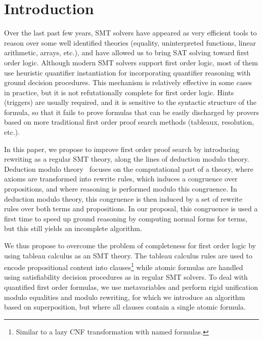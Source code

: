 
\section{Introduction}

Over the last past few
years, SMT solvers have appeared as very efficient tools to reason over some
well identified theories (equality, uninterpreted functions, linear arithmetic,
arrays, etc.), and have allowed us to bring SAT solving toward first order logic.
Although modern SMT solvers support first order logic, most of them use
heuristic quantifier instantiation for incorporating quantifier reasoning with
ground decision procedures. This mechanism is relatively effective in some cases
in practice, but it is not refutationally complete for first order logic. Hints
(triggers) are usually required, and it is sensitive to the syntactic structure
of the formula, so that it fails to prove formulas that can be easily discharged
by provers based on more traditional first order proof search methods (tableaux,
resolution, etc.).

In this paper, we propose to improve first order proof search by introducing
rewriting as a regular SMT theory, along the lines of
deduction modulo theory. Deduction modulo theory~\cite{DA03} focuses on the
computational part of a theory, where axioms are transformed into rewrite rules,
which induces a congruence over propositions, and where reasoning is performed
modulo this congruence. In deduction modulo theory, this congruence is then
induced by a set of rewrite rules over both terms and propositions. In our
proposal, this congruence is used a first time to speed up ground reasoning
by computing normal forms for terms, but this still yields an incomplete
algorithm.

We thus propose to overcome the problem of completeness for first
order logic by using tableau calculus as an SMT theory. The tableau calculus
rules are used to encode propositional content into clauses\footnote{Similar to
a lazy CNF transformation with named formulas.} while atomic
formulas are handled using satisfiability decision procedures as in
regular SMT solvers. To deal with quantified first order formulas, we use
metavariables and perform rigid unification modulo equalities and modulo rewriting,
for which we introduce an algorithm based on superposition, but where all clauses
contain a single atomic formula.

